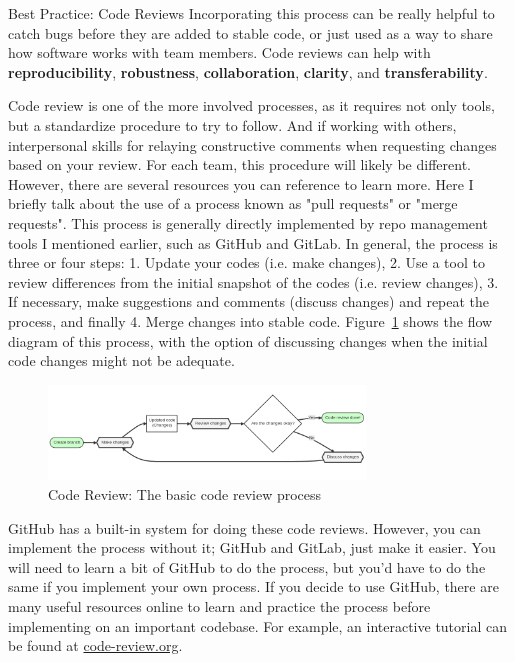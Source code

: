 \documentclass[final]{beamer}
\newlength{\colwidth}
\begin{document}
\begin{frame}[t]
\begin{columns}[t]
\begin{column}{\colwidth}
\begin{block}{Best Practice: Code Reviews}
    Incorporating this process can be really helpful to catch bugs before they
    are added to stable code, or just used as a way to share how software works
    with team members.
    Code reviews can help with \textbf{reproducibility},
    \textbf{robustness},  \textbf{collaboration}, \textbf{clarity}, and 
    \textbf{transferability}.
  
    Code review is one of the more involved processes, as it requires not only
    tools, but a standardize procedure to try to follow.
    And if working with others, interpersonal skills for relaying constructive
    comments when requesting changes based on your review.
    For each team, this procedure will likely be different.
    However, there are several resources you can reference to learn more.
    Here I briefly talk about the use of a process known as "pull requests" or
    "merge requests".
    This process is generally directly implemented by repo management tools I
    mentioned earlier, such as GitHub and GitLab.
    In general, the process is three or four steps:
    1. Update your codes (i.e. make changes),
    2. Use a tool to review differences from the initial snapshot of the codes
    (i.e. review changes),
    3. If necessary, make suggestions and comments (discuss changes) and
    repeat the process, and finally
    4. Merge changes into stable code.
    Figure~\ref*{fig:code-review} shows the flow diagram of this process, with
    the option of discussing changes when the initial code changes might not be
    adequate.

    \begin{figure}
      \centering
      \vspace{-1em}
      \includegraphics[width=0.75\textwidth]{tess2024/code-review-flow-diagram.png}
      \caption{Code Review: The basic code review process}
      \label{fig:code-review}
    \end{figure}
    
    GitHub has a built-in system for doing these code reviews.
    However, you can implement the process without it; GitHub and GitLab, just
    make it easier.
    You will need to learn a bit of GitHub to do the process, but you'd have to
    do the same if you implement your own process.
    If you decide to use GitHub, there are many useful resources online to learn
    and practice the process before implementing on an important codebase.
    For example, an interactive tutorial can be found at
    \href{https://code-review.org}{code-review.org}\cite{code-review}.


\end{block}
\end{column}
\end{columns}
\end{frame}
\end{document}
